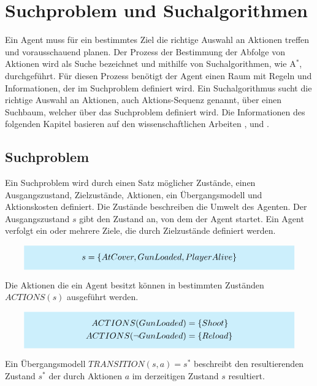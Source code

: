 \newcommand{\highlightbox}[2]{%
    \colorbox{cyan!20}{%
        \parbox{#1}{\vspace{0.5em}\centering #2\vspace{0.5em}}%
    }%
}

\chapter{Suchproblem und Suchalgorithmen}

Ein Agent muss für ein bestimmtes Ziel die richtige Auswahl an Aktionen treffen und vorausschauend planen. Der Prozess der Bestimmung der Abfolge von Aktionen wird als Suche bezeichnet und mithilfe von Suchalgorithmen, wie A$^*$, durchgeführt. Für diesen Prozess benötigt der Agent einen Raum mit Regeln und Informationen, der im Suchproblem definiert wird. Ein Suchalgorithmus sucht die richtige Auswahl an Aktionen, auch Aktions-Sequenz genannt, über einen Suchbaum, welcher über das Suchproblem definiert wird. Die Informationen des folgenden Kapitel basieren auf den wissenschaftlichen Arbeiten \autocite{RN2020}, \autocite{4082128} und \autocite{Felner2011}.

\section{Suchproblem}

Ein Suchproblem wird durch einen Satz möglicher Zustände, einen Ausgangszustand, Zielzustände, Aktionen, ein Übergangsmodell und Aktionskosten definiert. Die Zustände beschreiben die Umwelt des Agenten. Der Ausgangszustand $s$ gibt den Zustand an, von dem der Agent startet. Ein Agent verfolgt ein oder mehrere Ziele, die durch Zielzustände definiert werden.

\[
\highlightbox{0.9\textwidth}{$
    \begin{aligned}
			s = \{AtCover, GunLoaded, PlayerAlive\}
    \end{aligned}
$}
\]

Die Aktionen die ein Agent besitzt können in bestimmten Zuständen $ACTIONS(s)$ ausgeführt werden.

\[
\highlightbox{0.9\textwidth}{$
    \begin{aligned}
			ACTIONS(GunLoaded) &= \{Shoot\} \\
			ACTIONS(\lnot GunLoaded) &= \{Reload\}
    \end{aligned}
$}
\]

Ein Übergangsmodell $TRANSITION(s,a) = s^*$ beschreibt den resultierenden Zustand $s^*$ der durch Aktionen $a$ im derzeitigen Zustand $s$ resultiert.

